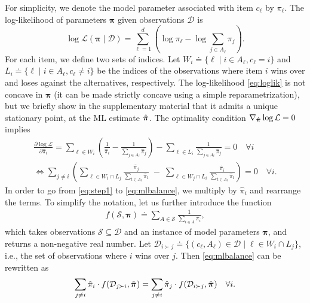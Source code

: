For simplicity, we denote the model parameter associated with item $c_\ell$ by $\pi_\ell$.
The log-likelihood of parameters $\bm{\pi}$ given observations $\mathcal{D}$ is
\begin{equation}
\label{eq:loglik}
\log \mathcal{L}(\bm{\pi} \mid \mathcal{D}) = \sum_{\ell = 1}^d \left( \log \pi_\ell - \log{\sum_{j \in A_\ell} \pi_j} \right).
\end{equation}
For each item, we define two sets of indices.
Let $W_i \doteq \{ \ell \mid i \in A_\ell, c_\ell = i \}$ and $L_i \doteq \{ \ell \mid i \in A_\ell, c_\ell \ne i \}$ be the indices of the observations where item $i$ wins over and loses against the alternatives, respectively.
The log-likelihood \eqref{eq:loglik} is not concave in $\bm{\pi}$ (it can be made strictly concave using a simple reparametrization), but we briefly show in the supplementary material that it admits a unique stationary point, at the ML estimate $\hat{\bm{\pi}}$.
The optimality condition $\nabla_{\hat{\bm{\pi}}} \log \mathcal{L} = 0$ implies
\begin{align}
 \frac{\partial \log \mathcal{L}}{\partial \hat{\pi}_i}
     = \sum_{\ell \in W_i} \left( \frac{1}{\hat{\pi}_i} - \frac{1}{\sum_{j \in A_\ell} \hat{\pi}_j} \right)
       - \sum_{\ell \in L_i} \frac{1}{\sum_{j \in A_\ell} \hat{\pi}_j} = 0 \quad \forall i \label{eq:step1} \\
 \iff  \sum_{j \ne i} \left(
      \sum_{\ell \in W_i \cap L_j} \frac{\hat{\pi}_j}{\sum_{t \in A_\ell} \hat{\pi}_t}
      \;-\; \sum_{\ell \in W_j \cap L_i} \frac{\hat{\pi}_i}{\sum_{t \in A_\ell} \hat{\pi}_t}
      \right) = 0 \quad \forall i. \label{eq:mlbalance}
\end{align}
In order to go from \eqref{eq:step1} to \eqref{eq:mlbalance}, we multiply by $\hat{\pi}_i$ and rearrange the terms.
To simplify the notation, let us further introduce the function
\begin{align*}
f(\mathcal{S}, \bm{\pi}) \doteq \sum_{A \in \mathcal{S}} \frac{1}{\sum_{i \in A} \pi_i},
\end{align*}
which takes observations $\mathcal{S} \subseteq \mathcal{D}$ and an instance of model parameters $\bm{\pi}$, and returns a non-negative real number.
Let $\mathcal{D}_{i \succ j} \doteq \{ (c_\ell, A_\ell) \in \mathcal{D} \mid \ell \in W_i \cap L_j \}$, i.e., the set of observations where $i$ wins over $j$.
Then \eqref{eq:mlbalance} can be rewritten as
\begin{align}
\label{eq:master}
\sum_{j \ne i} \hat{\pi}_i \cdot f(\mathcal{D}_{j \succ i}, \hat{\bm{\pi}})
= \sum_{j \ne i} \hat{\pi}_j \cdot f(\mathcal{D}_{i \succ j}, \hat{\bm{\pi}}) \quad \forall i.
\end{align}
